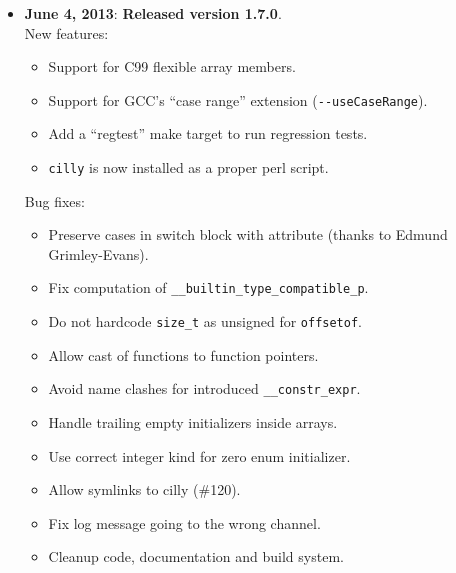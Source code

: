 \documentclass[letterpaper]{article}
\begin{document}
\begin{itemize}
\item{\bf June 4, 2013}: {\bf Released version 1.7.0}.\\
    New features:
    \begin{itemize}
      \item Support for C99 flexible array members.
      \item Support for GCC's ``case range'' extension (\verb|--useCaseRange|).
      \item Add a ``regtest'' make target to run regression tests.
      \item \texttt{cilly} is now installed as a proper perl script.
    \end{itemize}
    Bug fixes:
    \begin{itemize}
      \item Preserve cases in switch block with attribute (thanks to Edmund Grimley-Evans).
      \item Fix computation of \verb|__builtin_type_compatible_p|.
      \item Do not hardcode \verb|size_t| as unsigned for \verb|offsetof|.
      \item Allow cast of functions to function pointers.
      \item Avoid name clashes for introduced \verb|__constr_expr|.
      \item Handle trailing empty initializers inside arrays.
      \item Use correct integer kind for zero enum initializer.
      \item Allow symlinks to cilly (\#120).
      \item Fix log message going to the wrong channel.
      \item Cleanup code, documentation and build system.
    \end{itemize}


\end{itemize}
\end{document}
